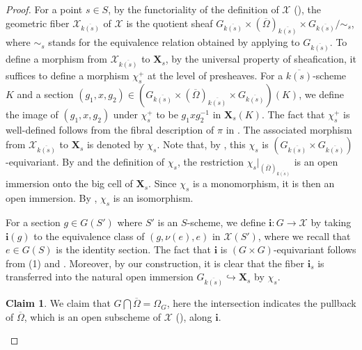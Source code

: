 \documentclass[11pt, reqno]{amsart}
\theoremstyle{plain}
\theoremstyle{definition}
\newtheorem{claim}[theorem]{Claim}
\begin{document}
\begin{proof}

For a point $s\in S$, by the functoriality of the definition of $\mathcal{X}$ (), the geometric fiber $\mathcal{X}_{\overline{k(s)}}$ of $\mathcal{X}$ is the quotient sheaf $G_{\overline{k(s)}}\times(\overline{\Omega})_{\overline{k(s)}}\times G_{\overline{k(s)}}/\sim_s$, where $\sim_s$ stands for the equivalence relation obtained by applying  to $G_{\overline{k(s)}}$. To define a morphism from $\mathcal{X}_{\overline{k(s)}}$ to $\mathbf{X}_s$, by the universal property of sheafication, it suffices to define a morphism $\chi_s^+$ at the level of presheaves. For a $\overline{k(s)}$-scheme $K$ and a section $(g_1,x,g_2)\in(G_{\overline{k(s)}}\times(\overline{\Omega})_{\overline{k(s)}}\times G_{\overline{k(s)}})(K)$, we define the image of $(g_1,x,g_2)$ under $\chi_s^+$ to be $g_1xg_2^{-1}$ in $\mathbf{X}_s(K)$. The fact that $\chi_s^+$ is well-defined follows from the fibral description of $\pi$ in . The associated morphism from $\mathcal{X}_{\overline{k(s)}}$ to $\mathbf{X}_s$ is denoted by $\chi_s$. Note that, by , this $\chi_s$ is $(G_{\overline{k(s)}}\times G_{\overline{k(s)}})$-equivariant. By  and the definition of $\chi_s$, the restriction $\chi_s\vert_{(\overline{\Omega})_{\overline{k(s)}}}$ is an open immersion onto the big cell of $\mathbf{X}_s$. Since $\chi_s$ is a monomorphism, it is then an open immersion. By , $\chi_s$ is an isomorphism.

For a section $g\in G(S')$ where $S'$ is an $S$-scheme, we define $\mathbf{i}\colon G\rightarrow\mathcal{X}$ by taking $\mathbf{i}(g)$ to the equivalence class of $(g,\nu(e),e)$ in $\mathcal{X}(S')$, where we recall that $e\in G(S)$ is the identity section. The fact that $\mathbf{i}$ is $(G\times G)$-equivariant follows from   (1) and .  Moreover, by our construction, it is clear that the fiber $\mathbf{i}_s$ is transferred into the natural open immersion $G_{\overline{k(s)}}\hookrightarrow \mathbf{X}_s$ by $\chi_s$.
    
    \begin{claim}\label{intersectionofbigcell}
        We claim that $G\bigcap \overline{\Omega}=\Omega_G$, here the intersection indicates the pullback of $\overline{\Omega}$, which is an open subscheme of $\mathcal{X}$ (), along $\mathbf{i}$.
    \end{claim}


\end{proof}
\end{document}
